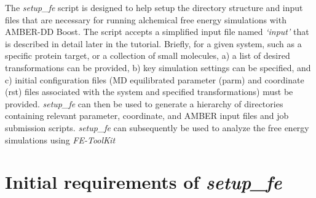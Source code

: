 \documentclass[11pt,letterpaper,titlepage]{article}
\begin{document}
The \textit{setup\_fe} script is designed to help setup the directory structure and input files that are necessary for 
running alchemical free energy simulations with AMBER-DD Boost. The script accepts a simplified input file named \textit{‘input’} that
is described in detail later in the tutorial. Briefly, for a given system, such as a specific protein target, or a collection of 
small molecules, a) a list of desired transformations can be provided, b) key simulation settings can be specified, 
and c) initial configuration files (MD equilibrated parameter (parm) and coordinate (rst) files associated with the system and
specified transformations) must be provided. \textit{setup\_fe} can then be used to generate a hierarchy of directories 
containing relevant parameter, coordinate, and AMBER input files and job submission scripts. \textit{setup\_fe} can subsequently be used 
to analyze the free energy simulations using \textit{FE-ToolKit}


\vspace{1cm}
\section{Initial requirements of \textit{setup\_fe}}
\vspace{1cm}
\end{document}
